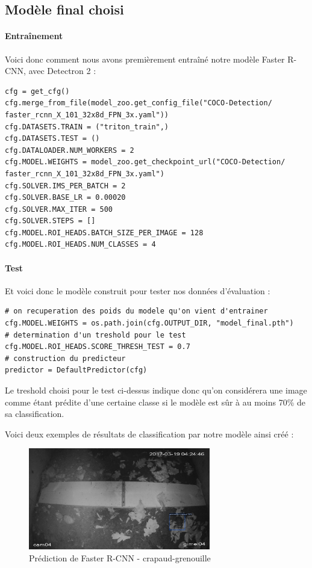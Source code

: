 \subsection{Modèle final choisi}\label{anal:final_model}

\paragraph{Entraînement}

Voici donc comment nous avons premièrement entraîné notre modèle Faster R-CNN, avec Detectron 2 : 

\lstset{language=Python}
\begin{lstlisting}
cfg = get_cfg()
cfg.merge_from_file(model_zoo.get_config_file("COCO-Detection/
faster_rcnn_X_101_32x8d_FPN_3x.yaml"))
cfg.DATASETS.TRAIN = ("triton_train",)
cfg.DATASETS.TEST = ()
cfg.DATALOADER.NUM_WORKERS = 2
cfg.MODEL.WEIGHTS = model_zoo.get_checkpoint_url("COCO-Detection/
faster_rcnn_X_101_32x8d_FPN_3x.yaml")  
cfg.SOLVER.IMS_PER_BATCH = 2 
cfg.SOLVER.BASE_LR = 0.00020 
cfg.SOLVER.MAX_ITER = 500 
cfg.SOLVER.STEPS = []   
cfg.MODEL.ROI_HEADS.BATCH_SIZE_PER_IMAGE = 128  
cfg.MODEL.ROI_HEADS.NUM_CLASSES = 4 
\end{lstlisting}


\paragraph{Test}

Et voici donc le modèle construit pour tester nos données d'évaluation : 

\lstset{style=Python}
\begin{lstlisting}
# on recuperation des poids du modele qu'on vient d'entrainer
cfg.MODEL.WEIGHTS = os.path.join(cfg.OUTPUT_DIR, "model_final.pth")  
# determination d'un treshold pour le test
cfg.MODEL.ROI_HEADS.SCORE_THRESH_TEST = 0.7  
# construction du predicteur
predictor = DefaultPredictor(cfg)
\end{lstlisting}

Le treshold choisi pour le test ci-dessus indique donc qu'on considérera une image comme étant prédite d'une certaine classe si le modèle est sûr à au moins 70\% de sa classification.\newline

Voici deux exemples de résultats de classification par notre modèle ainsi créé :

\begin{figure}[H]
    \centering
    \includegraphics[width=300px]{images/Eval_FasterRCNN_crapGren.png}
    \caption{Prédiction de Faster R-CNN - crapaud-grenouille}
    \label{fig:fasterRcnn_crapGren}
\end{figure}

